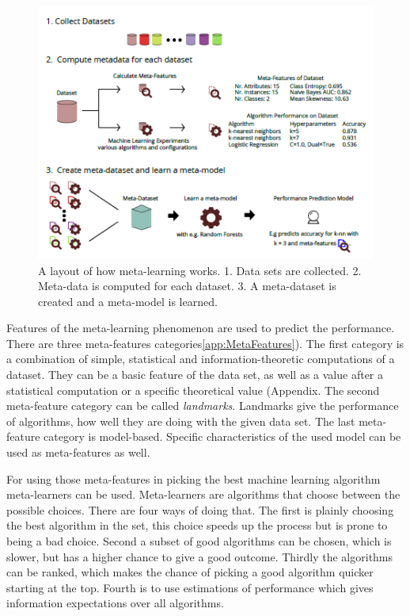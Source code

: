 \documentclass[10pt,a4paper]{report}
\begin{document}
	\begin{figure}
		
		\includegraphics[scale=1]{Meta-LearningLayout.png}
		\caption{A layout of how meta-learning works. 1. Data sets are collected. 2. Meta-data is computed for each dataset. 3. A meta-dataset is created and a meta-model is learned\cite{Gijsbers2017Thesis}.}
		\label{fig:Meta-LearningLayout}
	\end{figure}
	
	Features of the meta-learning phenomenon are used to predict the performance. There are three meta-features categories\ref{app:MetaFeatures}). The first category is a combination of simple, statistical and information-theoretic computations of a dataset. They can be a basic feature of the data set, as well as a value after a statistical computation or a specific theoretical value (Appendix. The second meta-feature category can be called \textit{landmarks}. Landmarks give the performance of algorithms, how well they are doing with the given data set. The last meta-feature category is model-based. Specific characteristics of the used model can be used as meta-features as well\cite{brazdil1994characterizing, vilalta2004using}.
	
	For using those meta-features in picking the best machine learning algorithm meta-learners can be used. Meta-learners are algorithms that choose between the possible choices. There are four ways of doing that. The first is plainly choosing the best algorithm in the set, this choice speeds up the process but is prone to being a bad choice. Second a subset of good algorithms can be chosen, which is slower, but has a higher chance to give a good outcome. Thirdly the algorithms can be ranked, which makes the chance of picking a good algorithm quicker starting at the top. Fourth is to use estimations of performance which gives information expectations over all algorithms\cite{brazdil2009development}.
	
\end{document}
